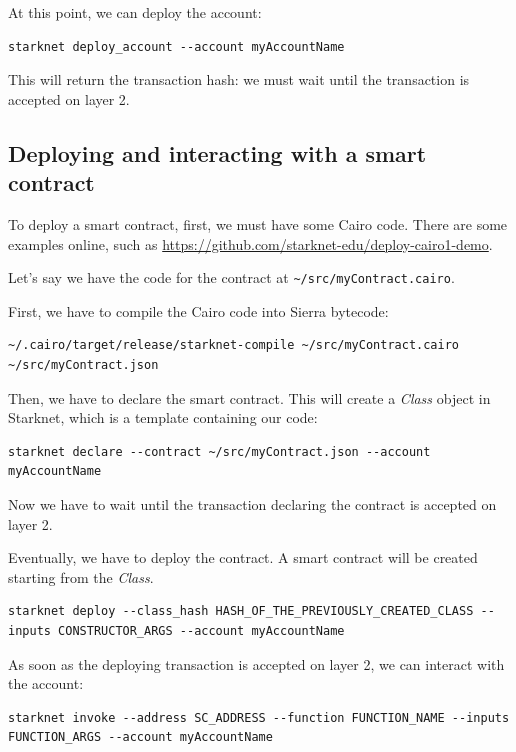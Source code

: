 \documentclass[12pt]{article}
\begin{document}
At this point, we can deploy the account:
\begin{lstlisting}[language=terminal]
    starknet deploy_account --account myAccountName
\end{lstlisting}

This will return the transaction hash: we must wait until the transaction is accepted on layer 2.

\subsection{Deploying and interacting with a smart contract} \label{subsubsection:daiwasc}
To deploy a smart contract, first, we must have some Cairo code. There are some examples online, such as \url{https://github.com/starknet-edu/deploy-cairo1-demo}.

Let's say we have the code for the contract at \verb|~/src/myContract.cairo|.

First, we have to compile the Cairo code into Sierra bytecode:
\begin{lstlisting}[language=terminal]
    ~/.cairo/target/release/starknet-compile ~/src/myContract.cairo ~/src/myContract.json
\end{lstlisting}

Then, we have to declare the smart contract. This will create a \emph{Class} object in Starknet, which is a template containing our code:
\begin{lstlisting}[language=terminal]
    starknet declare --contract ~/src/myContract.json --account myAccountName
\end{lstlisting}

Now we have to wait until the transaction declaring the contract is accepted on layer 2.

Eventually, we have to deploy the contract. A smart contract will be created starting from the \emph{Class}.
\begin{lstlisting}[language=terminal]
    starknet deploy --class_hash HASH_OF_THE_PREVIOUSLY_CREATED_CLASS --inputs CONSTRUCTOR_ARGS --account myAccountName
\end{lstlisting}

As soon as the deploying transaction is accepted on layer 2, we can interact with the account:
\begin{lstlisting}[language=terminal]
    starknet invoke --address SC_ADDRESS --function FUNCTION_NAME --inputs FUNCTION_ARGS --account myAccountName
\end{lstlisting}
\end{document}
